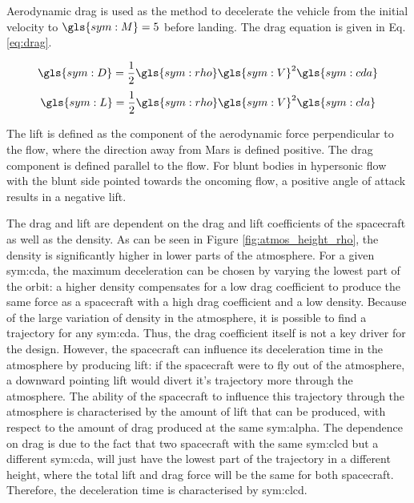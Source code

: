Aerodynamic drag is used as the method to decelerate the vehicle from the initial velocity to $\gls{sym:M}=5$ before landing. The drag equation is given in Eq. \ref{eq:drag}.

\begin{equation} \label{eq:drag}
\gls{sym:D} = \frac{1}{2}\gls{sym:rho}\gls{sym:V}^2\gls{sym:cda}
\end{equation}
\begin{equation} \label{eq:lift}
\gls{sym:L} = \frac{1}{2}\gls{sym:rho}\gls{sym:V}^2\gls{sym:cla}
\end{equation}

The lift is defined as the component of the aerodynamic force perpendicular to the flow, where the direction away from Mars is defined positive. The drag component is defined parallel to the flow. For blunt bodies in hypersonic flow with the blunt side pointed towards the oncoming flow, a positive angle of attack results in a negative lift.

The drag and lift are dependent on the drag and lift coefficients of the spacecraft as well as the density. As can be seen in Figure \ref{fig:atmos_height_rho}, the density is significantly higher in lower parts of the atmosphere. For a given \gls{sym:cda}, the maximum deceleration can be chosen by varying the lowest part of the orbit: a higher density compensates for a low drag coefficient to produce the same force as a spacecraft with a high drag coefficient and a low density. Because of the large variation of density in the atmosphere, it is possible to find a trajectory for any \gls{sym:cda}. Thus, the drag coefficient itself is not a key driver for the design. However, the spacecraft can influence its deceleration time in the atmosphere by producing lift: if the spacecraft were to fly out of the atmosphere, a downward pointing lift would divert it's trajectory more through the atmosphere. The ability of the spacecraft to influence this trajectory through the atmosphere is characterised by the amount of lift that can be produced, with respect to the amount of drag produced at the same \gls{sym:alpha}. The dependence on drag is due to the fact that two spacecraft with the same \gls{sym:clcd} but a different \gls{sym:cda}, will just have the lowest part of the trajectory in a different height, where the total lift and drag force will be the same for both spacecraft. Therefore, the deceleration time is characterised by \gls{sym:clcd}. \\

